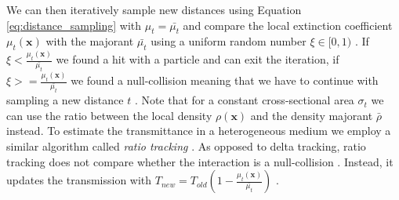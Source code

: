 We can then iteratively sample new distances using Equation \ref{eq:distance_sampling} with $\mu_t=\bar{\mu_t}$ and compare the local extinction coefficient $\mu_t(\boldsymbol{x})$ with the majorant $\bar{\mu_t}$ using a uniform random number $\xi\in[0,1)$ \cite{spectral_and_decomposition_tracking}.
If $\xi<\frac{\mu_t(\boldsymbol{x})}{\bar{\mu_t}}$ we found a hit with a particle and can exit the iteration, if $\xi>=\frac{\mu_t(\boldsymbol{x})}{\bar{\mu_t}}$ we found a null-collision meaning that we have to continue with sampling a new distance $t$ \cite{spectral_and_decomposition_tracking}.
Note that for a constant cross-sectional area $\sigma_t$ we can use the ratio between the local density $\rho(\boldsymbol{x})$ and the density majorant $\bar{\rho}$ instead.
To estimate the transmittance in a heterogeneous medium we employ a similar algorithm called \textit{ratio tracking} \cite{novak_ratio_tracking}.
As opposed to delta tracking, ratio tracking does not compare whether the interaction is a null-collision \cite{novak_ratio_tracking}.
Instead, it updates the transmission with $T_{new} = T_{old}(1 - \frac{\mu_t(\boldsymbol{x})}{\bar{\mu_t}})$ \cite{novak_ratio_tracking}.

